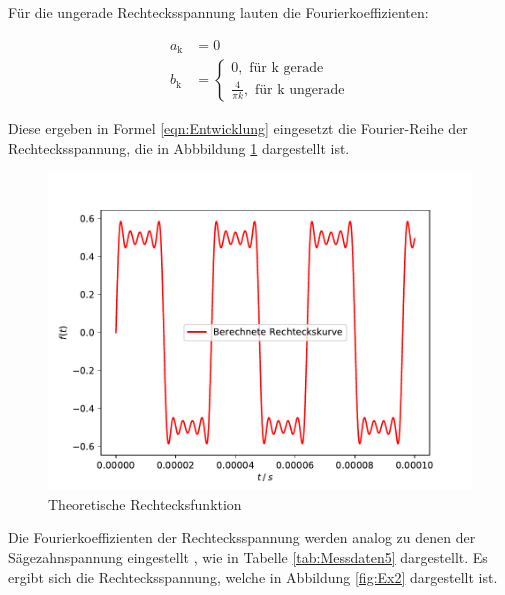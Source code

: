 Für die ungerade Rechtecksspannung lauten die Fourierkoeffizienten:

\begin{align*}
    a_\text{k} &= 0 \\
    b_\text{k} &= 
        \begin{cases} 
            0, \text{ für k gerade} \\ \frac{4}{\pi k}, \text{ für k ungerade}
        \end{cases}
\end{align*}

Diese ergeben in Formel \eqref{eqn:Entwicklung} eingesetzt die Fourier-Reihe
der Rechtecksspannung, die in Abbbildung \ref{fig:Theo2}  dargestellt ist.

\begin{figure}
    \includegraphics[scale = 1.0]{content/plot5.pdf}
    \caption{Theoretische Rechtecksfunktion}
    \label{fig:Theo2}
\end{figure}

Die Fourierkoeffizienten der Rechtecksspannung werden analog zu denen der Sägezahnspannung
eingestellt , wie in Tabelle \ref{tab:Messdaten5} dargestellt. 
Es ergibt sich die Rechtecksspannung, welche in Abbildung \ref{fig:Ex2}
dargestellt ist.

